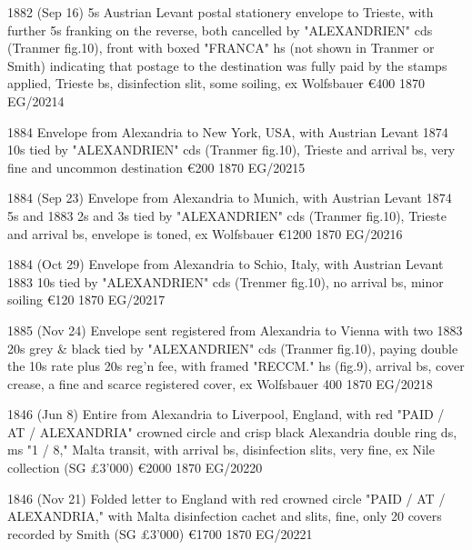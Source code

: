 \documentclass[justified]{tufte-book}
\begin{document}
%
{1882 (Sep 16) 5s Austrian Levant postal stationery envelope to Trieste, with further 5s franking on the reverse, both cancelled by "ALEXANDRIEN" cds (Tranmer fig.10), front with boxed "FRANCA" hs (not shown in Tranmer or Smith) indicating that postage to the destination was fully paid by the stamps applied, Trieste bs, disinfection slit, some soiling, ex Wolfsbauer
\euro 400
}
{1870}%
{EG/20214}%
{}%
{}
{}%
{}


%
{1884 Envelope from Alexandria to New York, USA, with Austrian Levant 1874 10s tied by "ALEXANDRIEN" cds (Tranmer fig.10), Trieste and arrival bs, very fine and uncommon destination \euro 200
}
{1870}%
{EG/20215}%
{}%
{}
{}%
{}


%
{1884 (Sep 23) Envelope from Alexandria to Munich, with Austrian Levant 1874 5s and 1883 2s and 3s tied by "ALEXANDRIEN" cds (Tranmer fig.10), Trieste and arrival bs, envelope is toned, ex Wolfsbauer \euro 1200
}
{1870}%
{EG/20216}%
{}%
{}
{}%
{}

%
{1884 (Oct 29) Envelope from Alexandria to Schio, Italy, with Austrian Levant 1883 10s tied by "ALEXANDRIEN" cds (Trenmer fig.10), no arrival bs, minor soiling \euro120
}
{1870}%
{EG/20217}%
{}%
{}
{}%
{}

%
{1885 (Nov 24) Envelope sent registered from Alexandria to Vienna with two 1883 20s grey \& black tied by "ALEXANDRIEN" cds (Tranmer fig.10), paying double the 10s rate plus 20s reg'n fee, with framed "RECCM." hs (fig.9), arrival bs, cover crease, a fine and scarce registered cover, ex Wolfsbauer 400
}
{1870}%
{EG/20218}%
{}%
{}
{}%
{}


%
{1846 (Jun 8) Entire from Alexandria to Liverpool, England, with red "PAID / AT / ALEXANDRIA" crowned circle and crisp black Alexandria double ring ds, ms "1 / 8," Malta transit, with arrival bs, disinfection slits, very fine, 
ex Nile collection (SG \pounds{3'000}) \euro2000
}
{1870}%
{EG/20220}%
{}%
{}
{}%
{}

%
{1846 (Nov 21) Folded letter to England with red crowned circle "PAID / AT / ALEXANDRIA," with Malta disinfection cachet and slits, fine, only 20 covers recorded by Smith (SG \pounds{3'000}) \euro1700
}
{1870}%
{EG/20221}%
{}%
{}
{}%
{}
\end{document}
